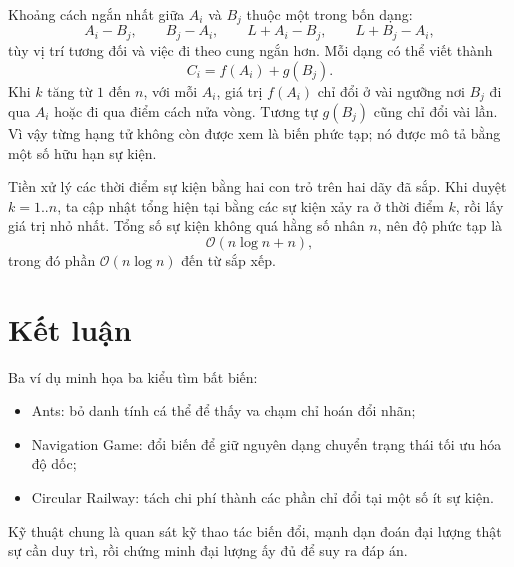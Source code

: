 \documentclass[11pt]{article}
\newcommand{\Oh}{\mathcal{O}}
\begin{document}
Khoảng cách ngắn nhất giữa \(A_i\) và \(B_j\) thuộc một trong bốn dạng:
\[
  A_i-B_j,\qquad B_j-A_i,\qquad L+A_i-B_j,\qquad L+B_j-A_i,
\]
tùy vị trí tương đối và việc đi theo cung ngắn hơn. Mỗi dạng có thể viết
thành
\[
  C_i=f(A_i)+g(B_j).
\]
Khi \(k\) tăng từ \(1\) đến \(n\), với mỗi \(A_i\), giá trị \(f(A_i)\) chỉ
đổi ở vài ngưỡng nơi \(B_j\) đi qua \(A_i\) hoặc đi qua điểm cách nửa vòng.
Tương tự \(g(B_j)\) cũng chỉ đổi vài lần. Vì vậy từng hạng tử không còn được
xem là biến phức tạp; nó được mô tả bằng một số hữu hạn sự kiện.

Tiền xử lý các thời điểm sự kiện bằng hai con trỏ trên hai dãy đã sắp. Khi
duyệt \(k=1..n\), ta cập nhật tổng hiện tại bằng các sự kiện xảy ra ở thời
điểm \(k\), rồi lấy giá trị nhỏ nhất. Tổng số sự kiện không quá hằng số nhân
\(n\), nên độ phức tạp là
\[
  \Oh(n\log n+n),
\]
trong đó phần \(\Oh(n\log n)\) đến từ sắp xếp.

\section{Kết luận}

Ba ví dụ minh họa ba kiểu tìm bất biến:
\begin{itemize}
  \item Ants: bỏ danh tính cá thể để thấy va chạm chỉ hoán đổi nhãn;
  \item Navigation Game: đổi biến để giữ nguyên dạng chuyển trạng thái tối ưu
  hóa độ dốc;
  \item Circular Railway: tách chi phí thành các phần chỉ đổi tại một số ít
  sự kiện.
\end{itemize}
Kỹ thuật chung là quan sát kỹ thao tác biến đổi, mạnh dạn đoán đại lượng thật
sự cần duy trì, rồi chứng minh đại lượng ấy đủ để suy ra đáp án.
\end{document}
